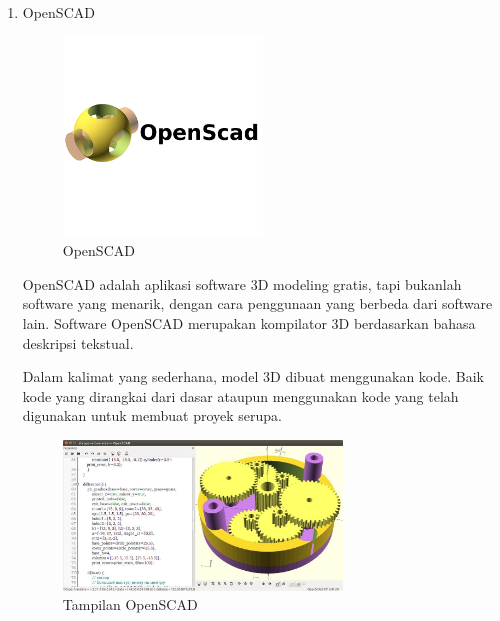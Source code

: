 \begin{enumerate}
\item OpenSCAD
\begin{figure}[H]
\centering
\includegraphics[width=0.5\textwidth]{figures/openscad1.png}
\caption{OpenSCAD}
\label{print}
\end{figure}

\par OpenSCAD adalah aplikasi software 3D modeling gratis, tapi bukanlah software yang menarik, dengan cara penggunaan yang berbeda dari software lain. Software OpenSCAD merupakan kompilator 3D berdasarkan bahasa deskripsi tekstual.
\par Dalam kalimat yang sederhana, model 3D dibuat menggunakan kode. Baik kode yang dirangkai dari dasar ataupun menggunakan kode yang telah digunakan untuk membuat proyek serupa.
\begin{figure}[H]
\centering
\includegraphics[width=0.7\textwidth]{figures/openscad.jpg}
\caption{Tampilan OpenSCAD}
\label{print}
\end{figure}
\end{enumerate}

